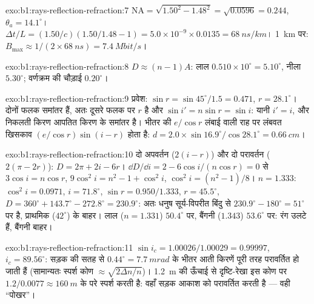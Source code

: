 \begin{solution}{exo:b1:rays-reflection-refraction:7}
$\mathrm{NA} = \sqrt{1.50^2 - 1.48^2} = \sqrt{0.0596} = 0.244$,
$\theta_a = 14.1^\circ$। $\Delta t/L = (1.50/c)(1.50/1.48 - 1) =
5.0\times10^{-9} \times 0.0135 = \qty{68}{ns/km}$। \qty{1}{km} पर:
$B_{\max} \approx 1/(2 \times \qty{68}{ns}) = \qty{7.4}{Mbit/s}$।
\end{solution}

\begin{solution}{exo:b1:rays-reflection-refraction:8}
$D \approx (n - 1)A$: लाल $0.510 \times 10^\circ = 5.10^\circ$, नीला
$5.30^\circ$; वर्णक्रम की चौड़ाई $0.20^\circ$।
\end{solution}

\begin{solution}{exo:b1:rays-reflection-refraction:9}
प्रवेश: $\sin r = \sin 45^\circ/1.5 = 0.471$, $r = 28.1^\circ$। दोनों
फलक समांतर हैं, अतः दूसरे फलक पर  $r$ है और
$\sin i' = n\sin r = \sin i$: यानी $i' = i$, और निकलती किरण आपतित किरण के
समांतर है। भीतर की $e/\cos r$ लंबाई वाली राह पर लंबवत खिसकाव
$(e/\cos r)\sin(i - r)$ होता है:
$d = 2.0 \times \sin 16.9^\circ/\cos 28.1^\circ = \qty{0.66}{cm}$।
\end{solution}

\begin{solution}{exo:b1:rays-reflection-refraction:10}
दो अपवर्तन ($2(i - r)$) और दो परावर्तन ($2(\pi - 2r)$):
$D = 2\pi + 2i - 6r$। $\dd D/\dd i = 2 - 6\cos i/(n\cos r) = 0$ से
$3\cos i = n\cos r$, $9\cos^2 i = n^2 - 1 + \cos^2 i$, $\cos^2 i =
(n^2 - 1)/8$। $n = 1.333$: $\cos^2 i = 0.0971$, $i = 71.8^\circ$,
$\sin r = 0.950/1.333$, $r = 45.5^\circ$, $D = 360^\circ + 143.7^\circ -
272.8^\circ = 230.9^\circ$: अतः धनुष सूर्य-विपरीत बिंदु से $230.9^\circ - 180^\circ =
51^\circ$ पर है, प्राथमिक ($42^\circ$) के बाहर।
लाल ($n = 1.331$) $50.4^\circ$ पर, बैंगनी ($1.343$) $53.6^\circ$ पर:
रंग उलटे हैं, बैंगनी बाहर।
\end{solution}

\begin{solution}{exo:b1:rays-reflection-refraction:11}
$\sin i_c = 1.00026/1.00029 = 0.99997$, $i_c = 89.56^\circ$: सड़क की सतह से
$0.44^\circ = \qty{7.7}{mrad}$ के भीतर आती किरणें पूरी तरह
परावर्तित हो जाती हैं (सामान्यतः स्पर्श कोण $\approx \sqrt{2\Delta n/n}$)।
\qty{1.2}{m} की ऊँचाई से दृष्टि-रेखा इस कोण पर
$1.2/0.0077 \approx \qty{160}{m}$ के परे स्पर्श करती है: वहाँ सड़क आकाश को
परावर्तित करती है --- वही ``पोखर''।
\end{solution}

